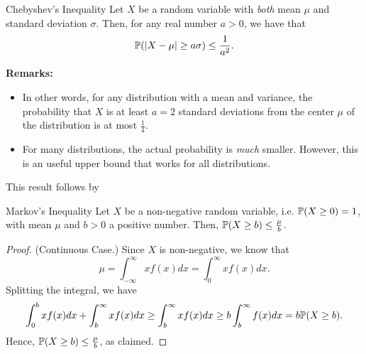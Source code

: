 \documentclass[letterpaper]{article}
\begin{document}
\begin{theorem}{Chebyshev's Inequality}{}
    Let $X$ be a random variable with \emph{both} mean $\mu$ and standard deviation $\sigma$. Then, for any real number $a > 0$, we have that 
    \[\mathbb{P}(|X - \mu| \geq a \sigma) \leq \frac{1}{a^2}.\]
\end{theorem}
\textbf{Remarks:}
\begin{itemize}
    \item In other words, for any distribution with a mean and variance, the probability that $X$ is at least $a = 2$ standard deviations from the center $\mu$ of the distribution is at most $\frac{1}{4}$.
    \item For many distributions, the actual probability is \emph{much} smaller. However, this is an useful upper bound that works for all distributions.
\end{itemize}
This result follows by 
\begin{theorem}{Markov's Inequality}{}
    Let $X$ be a non-negative random variable, i.e. $\mathbb{P}(X \geq 0) = 1$, with mean $\mu$ and $b > 0$ a positive number. Then, $\mathbb{P}(X \geq b) \leq \frac{\mu}{b}$. 
\end{theorem}

\begin{mdframed}[]
    \begin{proof}
        (Continuous Case.) Since $X$ is non-negative, we know that 
        \[\mu = \int_{-\infty}^{\infty} xf(x) dx = \int_0^{\infty} xf(x) dx.\]
        Splitting the integral, we have 
        \[\int_{0}^{b} xf(x) dx + \int_{b}^{\infty} xf(x) dx \geq \int_{b}^{\infty} xf(x) dx \geq b \int_{b}^{\infty} f(x) dx = b \mathbb{P}(X \geq b).\]
        Hence, $\mathbb{P}(X \geq b) \leq \frac{\mu}{b}$, as claimed.
    \end{proof}
\end{mdframed}
\end{document}
